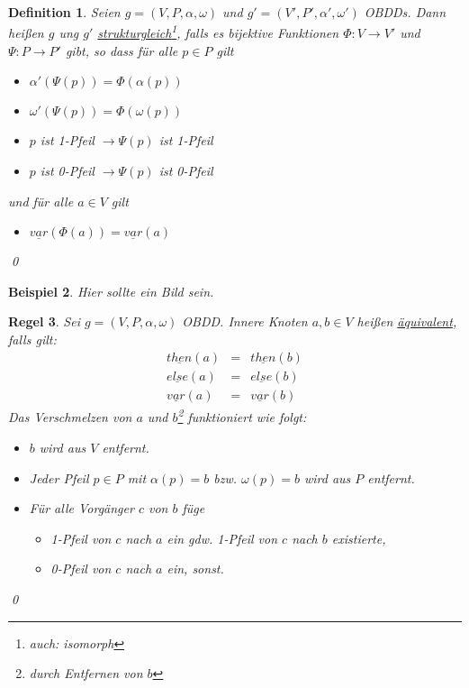 \documentclass[ngerman]{scrartcl}
\theoremstyle{custom}
\newtheorem{mdef}{Definition} \numberwithin{mdef}{subsection}
\newtheorem{mex}[mdef]{Beispiel}
\newtheorem{mr}[mdef]{Regel}
\newcommand{\0}{\mathbf{0}}
\newcommand{\1}{\mathbf{L}}
\begin{document}
\begin{mdef}
Seien $g=(V,P,\alpha,\omega)$ und $g'=(V',P',\alpha',\omega')$
OBDDs. Dann hei\ss en $g$ ung $g'$
\underline{strukturgleich}\footnote{auch: isomorph}, falls es bijektive
Funktionen $\Phi: V \rightarrow V'$ und $\Psi: P \rightarrow P'$ gibt, so dass f\"ur alle $p \in P$ gilt
\begin{itemize}
\item[(1)] $\alpha'(\Psi(p)) = \Phi(\alpha(p))$
\item[(2)] $\omega'(\Psi(p)) = \Phi(\omega(p))$
\item[(3)] $p$ ist 1-Pfeil $\rightarrow \Psi(p)$ ist 1-Pfeil
\item[(4)] $p$ ist 0-Pfeil $\rightarrow \Psi(p)$ ist 0-Pfeil
\end{itemize}
und f\"ur alle $a \in V$ gilt
\begin{itemize}
\item[(5)] $\underline{var}(\Phi(a)) = \underline{var}(a)$
\end{itemize}
\qed
\end{mdef}

\begin{mex}
Hier sollte ein Bild sein.
\end{mex}

\begin{mr}\label{regel:verschm}
Sei $g=(V,P,\alpha,\omega)$ OBDD. Innere Knoten $a,b \in V$ hei\ss en
\underline{\"aquivalent}, falls gilt:
\begin{eqnarray*}
\underline{then}(a) & = & \underline{then}(b)\\
\underline{else}(a) & = & \underline{else}(b)\\
\underline{var}(a) & = & \underline{var}(b)
\end{eqnarray*}
Das Verschmelzen von $a$ und $b$\footnote{durch Entfernen von $b$}
funktioniert wie folgt:
\begin{itemize}
\item[(1)] $b$ wird aus $V$ entfernt.
\item[(2)] Jeder Pfeil $p \in P$ mit $\alpha(p) = b$ bzw. $\omega(p)=b$
  wird aus $P$ entfernt.
\item[(3)] F\"ur alle Vorg\"anger $c$ von $b$ f\"uge
  \begin{itemize}
  \item[(i)] 1-Pfeil von $c$ nach $a$ ein gdw. 1-Pfeil von $c$ nach
    $b$ existierte,
  \item[(ii)] 0-Pfeil von $c$ nach $a$ ein, sonst.
  \end{itemize}
\end{itemize}
\qed
\end{mr}
\end{document}
